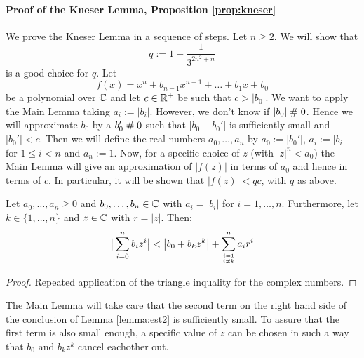 \paragraph{Proof of the Kneser Lemma, Proposition \ref{prop:kneser}} 
We prove the Kneser Lemma in a sequence of steps.
Let $n\geq 2$. We will show that 
$$ q:= 1-\frac{1}{3^{2n^2 +n}}$$
is a good choice for $q$. Let 
$$f(x)=x^n+b_{n-1}x^{n-1}+\ldots + b_1 x+b_0$$ 
be a polynomial over $\mathbb{C}$ and let $c\in \mathbb{R}^+$ be such that $c >
|b_0|$.  We want to apply the Main Lemma taking $a_i := |b_i|$. 
However, we don't know if $|b_0|\mathrel{\#} 0$. Hence we will approximate
$b_0$ by a $b_0'\mathrel{\#} 0$ such that $|b_0 - b_0'|$ is sufficiently 
small and $|b_0'|<c$.
Then we will define the real numbers $a_0, \ldots, a_{n}$  by
$a_0 := |b_0'|$, $a_i := |b_i|$ for $1\leq i < n$ and $a_n
:= 1$. Now, for a specific choice of $z$ (with $|z|^n < a_0$)
the Main Lemma will give an approximation of $|f(z)|$ in terms of 
$a_0$ and hence in terms of $c$. In particular, it will be shown 
that $|f(z)| < qc$, with $q$ as above. 

\begin{lemma}\label{lemma:est2}
Let $a_0,\ldots,a_n\ge 0$ and $b_0,\ldots,b_n\in\mathbb{C}$ with $a_i = |b_i|$ for
$i=1,\ldots,n$.
Furthermore, let $k\in\{1,\ldots,n\}$ and  $z\in\mathbb{C}$ with 
$r = |z|$.  Then:
$$\big|\sum_{i=0}^n b_i z^i\big| < \left|b_0 + b_k z^k\right| + \sum_{i=1\atop i\ne k}^n a_i r^i$$
\end{lemma}
\begin{proof}
Repeated application of the triangle inquality for the complex numbers.
\end{proof}

The Main Lemma will take care that the second term on the right hand
side of the conclusion of Lemma \ref{lemma:est2} is sufficiently
small. To assure that the first term is also small enough, a specific
value of $z$ can be chosen in such a way that $b_0$ and $b_k z^k$
cancel eachother out.

